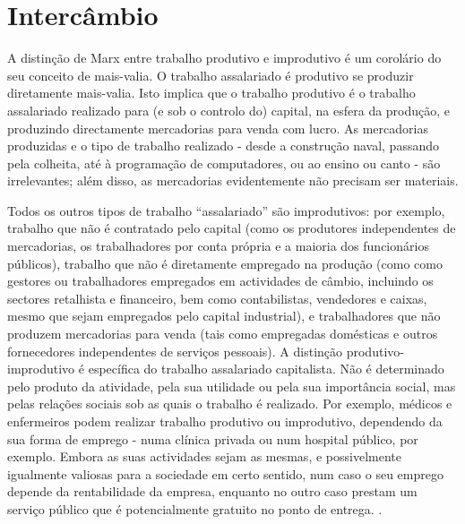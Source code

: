 \section{Intercâmbio}
 \par 
A distinção de Marx entre trabalho produtivo e improdutivo é um corolário do seu conceito de mais-valia. O trabalho assalariado é produtivo se produzir diretamente mais-valia. Isto implica que o trabalho produtivo é o trabalho assalariado realizado para (e sob o controlo do) capital, na esfera da produção, e produzindo directamente mercadorias para venda com lucro. As mercadorias produzidas e o tipo de trabalho realizado - desde a construção naval, passando pela colheita, até à programação de computadores, ou ao ensino ou canto - são irrelevantes; além disso, as mercadorias evidentemente não precisam ser materiais.
 \par 
Todos os outros tipos de trabalho “assalariado” são improdutivos: por exemplo, trabalho que não é contratado pelo capital (como os produtores independentes de mercadorias, os trabalhadores por conta própria e a maioria dos funcionários públicos), trabalho que não é diretamente empregado na produção (como como gestores ou trabalhadores empregados em actividades de câmbio, incluindo os sectores retalhista e financeiro, bem como contabilistas, vendedores e caixas, mesmo que sejam empregados pelo capital industrial), e trabalhadores que não produzem mercadorias para venda (tais como empregadas domésticas e outros fornecedores independentes de serviços pessoais). A distinção produtivo-improdutivo é específica do trabalho assalariado capitalista. Não é determinado pelo produto da atividade, pela sua utilidade ou pela sua importância social, mas pelas relações sociais sob as quais o trabalho é realizado. Por exemplo, médicos e enfermeiros podem realizar trabalho produtivo ou improdutivo, dependendo da sua forma de emprego - numa clínica privada ou num hospital público, por exemplo. Embora as suas actividades sejam as mesmas, e possivelmente igualmente valiosas para a sociedade em certo sentido, num caso o seu emprego depende da rentabilidade da empresa, enquanto no outro caso prestam um serviço público que é potencialmente gratuito no ponto de entrega. .
 \par 
